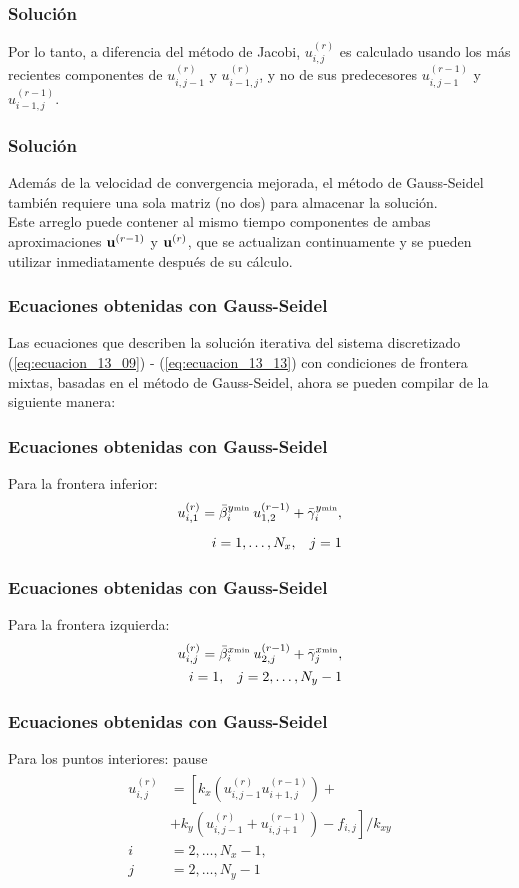 \documentclass[12pt]{beamer}
\begin{document}
\begin{frame}
\frametitle{Solución}
Por lo tanto, a diferencia del método de Jacobi, $u_{i,j}^{(r)}$ es calculado usando los más recientes componentes de $u_{i,j-1}^{(r)}$ y $u_{i-1, j}^{(r)}$, y no de sus predecesores $u_{i,j-1}^{(r-1)}$ y $u_{i-1, j}^{(r-1)}$.
\end{frame}
\begin{frame}
\frametitle{Solución}
Además de la velocidad de convergencia mejorada, el método de Gauss-Seidel también requiere una sola matriz (no dos) para almacenar la solución.
\\
\bigskip
\pause
Este arreglo puede contener al mismo tiempo componentes de ambas aproximaciones $\vb{u}^{(r-1)}$ y $\vb{u}^{(r)}$, que se actualizan continuamente y se pueden utilizar inmediatamente después de su cálculo.
\end{frame}
\begin{frame}
\frametitle{Ecuaciones obtenidas con Gauss-Seidel}
Las ecuaciones que describen la solución iterativa del sistema discretizado (\ref{eq:ecuacion_13_09}) -  (\ref{eq:ecuacion_13_13}) con condiciones de frontera mixtas, basadas en el método de Gauss-Seidel, ahora se pueden compilar de la siguiente manera:
\end{frame}
\begin{frame}
\frametitle{Ecuaciones obtenidas con Gauss-Seidel}
Para la frontera inferior:
\pause
\begin{align}
u_{i, 1}^{(r)} = \bar{\beta}_{i}^{y {\text{\tiny{min}}}} \: u_{1,2}^{(r-1)} + \bar{\gamma}_{i}^{y {\text{\tiny{min}}}}, \\[0.5em]
i = 1, \ldots, N_{x}, \hspace{0.3cm} j = 1 \nonumber
\label{eq:ecuacion_13_24}
\end{align}
\end{frame}
\begin{frame}
\frametitle{Ecuaciones obtenidas con Gauss-Seidel}
Para la frontera izquierda:
\pause
\begin{align}
u_{i, j}^{(r)} = \bar{\beta}_{i}^{x {\text{\tiny{min}}}} \: u_{2, j}^{(r-1)} + \bar{\gamma}_{j}^{x {\text{\tiny{min}}}}, \\
i = 1, \hspace{0.3cm} j = 2, \ldots, N_{y} - 1 \nonumber
\label{eq:ecuacion_13_25}
\end{align}
\end{frame}
\begin{frame}
\frametitle{Ecuaciones obtenidas con Gauss-Seidel}
Para los puntos interiores:
pause
\begin{align}
\begin{aligned}
u_{i,j}^{(r)} &= \left[ k_{x} \left( u_{i, j-1}^{(r)} u_{i+1, j}^{(r-1)} \right) + \right. \\
&+ \left. k_{y} \left( u_{i, j-1}^{(r)} + u_{i, j+1}^{(r-1)} \right) - f_{i,j} \right] / k_{xy} \\
i &= 2, \ldots, N_{x} - 1, \\
j &= 2, \ldots, N_{y} - 1 
\end{aligned}
\label{eq:ecuacion_13_26}
\end{align}    
\end{frame}
\end{document}

